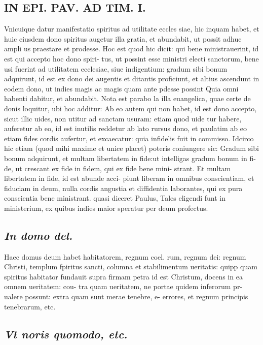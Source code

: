 \documentclass{article}
\begin{document}
\begin{pages}
\section*{IN EPI. PAV. AD TIM. I. }
\marginpar{[ p.88 ]}\pstart Vnicuique datur manifestatio spiritus ad utilitate eccles siae, hic inquam habet, et huic eiusdem dono spiritus augetur illa gratia, et abundabit, ut possit adhuc ampli us praestare et prodesse. Hoc est quod hic dicit: qui bene ministrauerint, id est qui accepto hoc dono spiri- tus, ut possint esse ministri electi sanctorum, bene usi fuerint ad utilitatem ecclesiae, siue indigentium: gradum sibi bonum adquirunt, id est ex dono dei augentis et ditantis proficiunt, et altius ascendunt in eodem dono, ut indies magis ac magis quam ante pdesse possint Quia omni habenti dabitur, et abundabit. Nota est parabo la illa euangelica, quae certe de donis loquitur, ubi hoc additur: Ab eo autem qui non habet, id est dono accepto, sicut illic uides, non utitur ad sanctam usuram: etiam quod uide tur habere, auferetur ab eo, id est inutilis reddetur ab lato rursus dono, et paulatim ab eo etiam fides cordis aufertur, et excaecatur: quia infidelis fuit in commisso. Idcirco hic etiam (quod mihi maxime et unice placet) poteris coniungere sic: Gradum sibi bonum adquirunt, et multam libertatem in fide:ut intelligas gradum bonum in fi- de, ut crescant ex fide in fidem, qui ex fide bene mini- strant. Et multam libertatem in fide, id est abunde acci- piunt liberam in omnibus conscientiam, et fiduciam in deum, nulla cordis angustia et diffidentia laborantes, qui ex pura conscientia bene ministrant. quasi diceret Paulus, Tales eligendi funt in ministerium, ex quibus indies maior speratur per deum profectus.  \pend
{}
{}
\subsection*{\textit{In domo del. }}\pstart Haec domus deum habet habitatorem, regnum coel. rum, regnum dei: regnum Christi, templum fpiritus sancti, columna et stabilimentum ueritatis: quipp quam spiritus habitator fundauit supra firmam petra id est Christum, docens in ea omnem ueritatem: cou- tra quam ueritatem, ne portae quidem inferorum pr- ualere possunt: extra quam sunt merae tenebre, e- errores, et regnum principis tenebrarum, etc.  \pend
{}
{}
\subsection*{\textit{Vt noris quomodo, etc. }}
{}

\end{pages}
\end{document}
